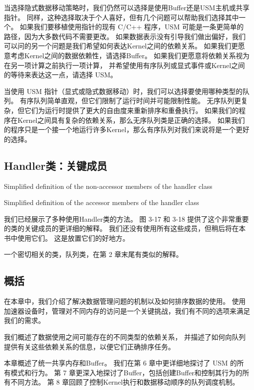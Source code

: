 当选择隐式数据移动策略时，我们仍然可以选择是使用Buffer还是USM主机或共享指针。 
同样，这种选择取决于个人喜好，但有几个问题可以帮助我们选择其中一个。 
如果我们要移植使用指针的现有 C/C++ 程序，USM 可能是一条更简单的路径，因为大多数代码不需要更改。 
如果数据表示没有引导我们做出偏好，我们可以问的另一个问题是我们希望如何表达Kernel之间的依赖关系。 
如果我们更愿意考虑Kernel之间的数据依赖性，请选择Buffer。 
如果我们更愿意将依赖关系视为在另一项计算之前执行一项计算，
并希望使用有序队列或显式事件或Kernel之间的等待来表达这一点，请选择 USM。

当使用 USM 指针（显式或隐式数据移动）时，我们可以选择要使用哪种类型的队列。 
有序队列简单直观，但它们限制了运行时间并可能限制性能。 
无序队列更复杂，但它们为运行时提供了更大的自由度来重新排序和重叠执行。 
如果我们的程序在Kernel之间具有复杂的依赖关系，那么无序队列类是正确的选择。 
如果我们的程序只是一个接一个地运行许多Kernel，那么有序队列对我们来说将是一个更好的选择。

\subsection{Handler类：关键成员}
{\color{red} Simplified definition of the non-accessor members of the handler class}

{\color{red} Simplified definition of the accessor members of the handler class}

我们已经展示了多种使用Handler类的方法。 图 3-17 和 3-18 提供了这个非常重要的类的关键成员的更详细的解释。 
我们还没有使用所有这些成员，但稍后将在本书中使用它们。 这是放置它们的好地方。

一个密切相关的类，队列类，在第 2 章末尾有类似的解释。

\subsection{概括}
在本章中，我们介绍了解决数据管理问题的机制以及如何排序数据的使用。 
使用加速器设备时，管理对不同内存的访问是一个关键挑战，我们有不同的选项来满足我们的需求。

我们概述了数据使用之间可能存在的不同类型的依赖关系，
并描述了如何向队列提供有关这些依赖关系的信息，以便它们正确排序任务。

本章概述了统一共享内存和Buffer。 我们在第 6 章中更详细地探讨了 USM 的所有模式和行为。
第 7 章更深入地探讨了Buffer，包括创建Buffer和控制其行为的所有不同方法。 
第 8 章回顾了控制Kernel执行和数据移动顺序的队列调度机制。